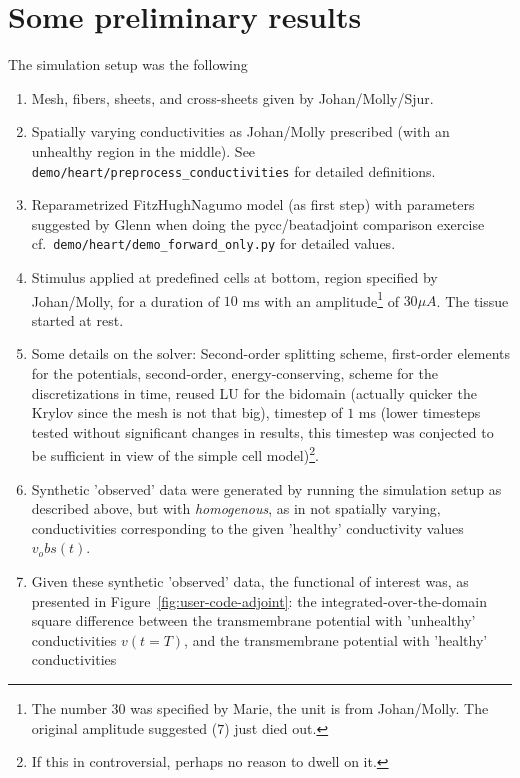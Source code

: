 \documentclass[a4paper, reqno]{amsart}
\numberwithin{equation}{section}
\begin{document}
\newpage
\section{Some preliminary results}

The simulation setup was the following
\begin{enumerate}
  \item
    Mesh, fibers, sheets, and cross-sheets given by Johan/Molly/Sjur.
  \item
    Spatially varying conductivities as Johan/Molly
    prescribed (with an unhealthy region in the middle). See
    \texttt{demo/heart/preprocess\_conductivities} for detailed
    definitions.
  \item
    Reparametrized FitzHughNagumo model (as first step) with
    parameters suggested by Glenn when doing the pycc/beatadjoint
    comparison exercise cf.~\texttt{demo/heart/demo\_forward\_only.py}
    for detailed values.
  \item
    Stimulus applied at predefined cells at bottom, region specified
    by Johan/Molly, for a duration of $10$ ms with an
    amplitude\footnote{The number $30$ was specified by Marie, the
      unit is from Johan/Molly. The original amplitude suggested ($7$)
      just died out.} of $30 \mu A$. The tissue started at rest.
  \item
    Some details on the solver: Second-order splitting scheme,
    first-order elements for the potentials, second-order,
    energy-conserving, scheme for the discretizations in time, reused
    LU for the bidomain (actually quicker the Krylov since the mesh is
    not that big), timestep of $1$ ms (lower timesteps tested without
    significant changes in results, this timestep was conjected to be
    sufficient in view of the simple cell model)\footnote{If this in
      controversial, perhaps no reason to dwell on it.}.
  \item
    Synthetic 'observed' data were generated by running the simulation
    setup as described above, but with \emph{homogenous}, as in not
    spatially varying, conductivities corresponding to the given
    'healthy' conductivity values $v_obs(t)$.
  \item
    Given these synthetic 'observed' data, the functional of interest
    was, as presented in Figure~\ref{fig:user-code-adjoint}: the
    integrated-over-the-domain square difference between the
    transmembrane potential with 'unhealthy' conductivities $v(t =
    T)$, and the transmembrane potential with 'healthy' conductivities

\end{enumerate}
\end{document}
